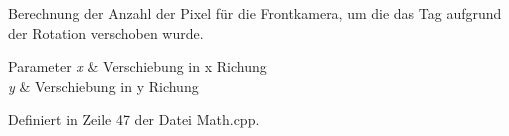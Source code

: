 Berechnung der Anzahl der Pixel für die Frontkamera, um die das Tag aufgrund der Rotation verschoben wurde. 


\begin{DoxyParams}{Parameter}
{\em x} & Verschiebung in x Richung \\
\hline
{\em y} & Verschiebung in y Richung \\
\hline
\end{DoxyParams}


Definiert in Zeile 47 der Datei Math.cpp.

